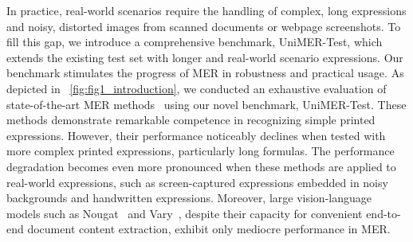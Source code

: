 \documentclass[runningheads]{llncs}
\begin{document}
In practice, real-world scenarios require the handling of complex, long expressions and noisy, distorted images from scanned documents or webpage screenshots.
To fill this gap, we introduce a comprehensive benchmark, UniMER-Test, which extends the existing test set with longer and real-world scenario expressions. 
Our benchmark stimulates the progress of MER in robustness and practical usage.
As depicted in ~\cref{fig:fig1_introduction}, we conducted an exhaustive evaluation of state-of-the-art MER methods~\cite{pix2tex2022,texify2023} using our novel benchmark, UniMER-Test. 
These methods demonstrate remarkable competence in recognizing simple printed expressions.
However, their performance noticeably declines when tested with more complex printed expressions, particularly long formulas. 
The performance degradation becomes even more pronounced when these methods are applied to real-world expressions, such as screen-captured expressions embedded in noisy backgrounds and handwritten expressions. 
Moreover, large vision-language models such as Nougat~\cite{blecher2023nougat} and Vary~\cite{wei2023vary}, despite their capacity for convenient end-to-end document content extraction, exhibit only mediocre performance in MER.
\end{document}
